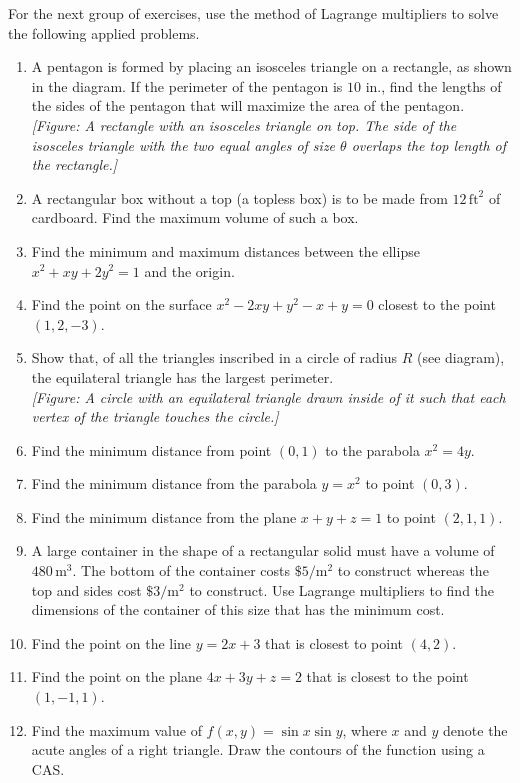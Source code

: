 \documentclass{exercises}
\begin{document}
For the next group of exercises, use the method of Lagrange multipliers to solve the following applied problems.

\begin{enumerate}[resume]
\item A pentagon is formed by placing an isosceles triangle on a rectangle, as shown in the diagram. If the perimeter of the pentagon is $10$ in., find the lengths of the sides of the pentagon that will maximize the area of the pentagon. \\ \textit{[Figure: A rectangle with an isosceles triangle on top. The side of the isosceles triangle with the two equal angles of size $\theta$ overlaps the top length of the rectangle.]}
\item A rectangular box without a top (a topless box) is to be made from $12\,\text{ft}^{2}$ of cardboard. Find the maximum volume of such a box.
\item Find the minimum and maximum distances between the ellipse $x^{2}+xy+2y^{2}=1$ and the origin.
\item Find the point on the surface $x^{2}-2xy+y^{2}-x+y=0$ closest to the point $(1,2,-3)$.
\item Show that, of all the triangles inscribed in a circle of radius $R$ (see diagram), the equilateral triangle has the largest perimeter. \\ \textit{[Figure: A circle with an equilateral triangle drawn inside of it such that each vertex of the triangle touches the circle.]}
\item Find the minimum distance from point $(0,1)$ to the parabola $x^{2}=4y$.
\item Find the minimum distance from the parabola $y=x^{2}$ to point $(0,3)$.
\item Find the minimum distance from the plane $x+y+z=1$ to point $(2,1,1)$.
\item A large container in the shape of a rectangular solid must have a volume of $480\,\text{m}^{3}$. The bottom of the container costs $\$5/\text{m}^{2}$ to construct whereas the top and sides cost $\$3/\text{m}^{2}$ to construct. Use Lagrange multipliers to find the dimensions of the container of this size that has the minimum cost.
\item Find the point on the line $y=2x+3$ that is closest to point $(4,2)$.
\item Find the point on the plane $4x+3y+z=2$ that is closest to the point $(1,-1,1)$.
\item Find the maximum value of $f(x,y)=\sin x\sin y$, where $x$ and $y$ denote the acute angles of a right triangle. Draw the contours of the function using a CAS.

\end{enumerate}
\end{document}
